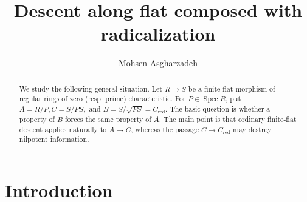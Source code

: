 \documentclass[10pt,a4paper]{amsart}
\theoremstyle{definition}
\theoremstyle{remark}
\newcommand{\Spec}{\operatorname{Spec}}
\begin{document}
	
	\author[]{Mohsen Asgharzadeh}
	
	\title[Flat radical pullback]{Descent along flat composed  with radicalization}
	
	\address{M. Asgharzadeh }
	
	
	
	
	
\begin{abstract}
We study the following general situation. Let $R\to S$ be a finite flat morphism of regular rings of zero (resp. prime) characteristic. For  $P\in\Spec R$, put $A=R/P,  C=S/PS,$ and $B=S/\sqrt{PS}=C_{\mathrm{red}}.$
The basic question is whether a property of $B$ forces the same property
of $A$. The main point is that ordinary finite-flat descent applies naturally to $A\to C$, whereas the passage $C\to C_{\mathrm{red}}$ may destroy nilpotent information. 
\end{abstract}
\maketitle


\section{Introduction}
\end{document}
